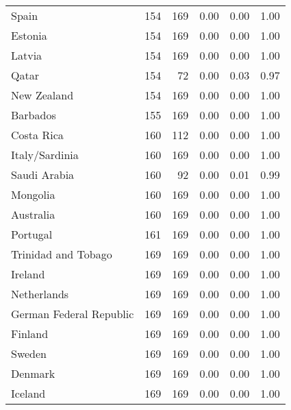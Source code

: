 \begin{longtable}[t]{lrrrrr}
Spain & 154 & 169 & 0.00 & 0.00 & 1.00\\
\addlinespace
Estonia & 154 & 169 & 0.00 & 0.00 & 1.00\\
Latvia & 154 & 169 & 0.00 & 0.00 & 1.00\\
Qatar & 154 & 72 & 0.00 & 0.03 & 0.97\\
New Zealand & 154 & 169 & 0.00 & 0.00 & 1.00\\
Barbados & 155 & 169 & 0.00 & 0.00 & 1.00\\
\addlinespace
Costa Rica & 160 & 112 & 0.00 & 0.00 & 1.00\\
Italy/Sardinia & 160 & 169 & 0.00 & 0.00 & 1.00\\
Saudi Arabia & 160 & 92 & 0.00 & 0.01 & 0.99\\
Mongolia & 160 & 169 & 0.00 & 0.00 & 1.00\\
Australia & 160 & 169 & 0.00 & 0.00 & 1.00\\
\addlinespace
Portugal & 161 & 169 & 0.00 & 0.00 & 1.00\\
Trinidad and Tobago & 169 & 169 & 0.00 & 0.00 & 1.00\\
Ireland & 169 & 169 & 0.00 & 0.00 & 1.00\\
Netherlands & 169 & 169 & 0.00 & 0.00 & 1.00\\
German Federal Republic & 169 & 169 & 0.00 & 0.00 & 1.00\\
\addlinespace
Finland & 169 & 169 & 0.00 & 0.00 & 1.00\\
Sweden & 169 & 169 & 0.00 & 0.00 & 1.00\\
Denmark & 169 & 169 & 0.00 & 0.00 & 1.00\\
Iceland & 169 & 169 & 0.00 & 0.00 & 1.00\\
\bottomrule
\end{longtable}
